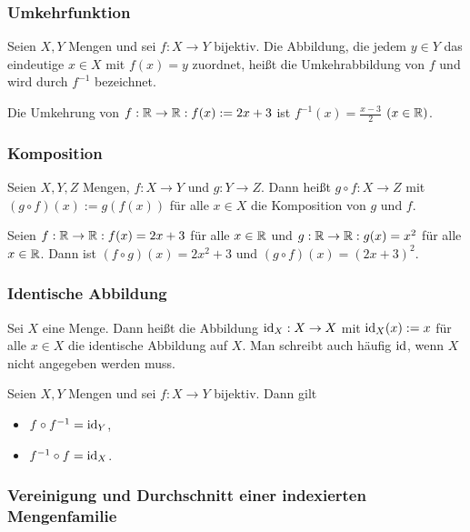 \subsubsection{Umkehrfunktion}

Seien $ X,Y $ Mengen und sei $ f : X \to Y $ bijektiv. Die Abbildung, die jedem $ y \in Y $ das eindeutige $ x \in X $ mit $ f(x) = y $ zuordnet, heißt die Umkehrabbildung von $ f $ und wird durch $ f^{-1} $ bezeichnet.

\begin{bsp}
	Die Umkehrung von $ f : \mathbb R \to \mathbb R : f(x) := 2x + 3 $ ist $ f^{-1}(x) = \frac{x-3}{2} $ $ ( x \in \mathbb R ) $.
\end{bsp}

\subsubsection{Komposition}

Seien $ X,Y,Z $ Mengen, $ f : X \to Y $ und $ g : Y \to Z $. Dann heißt $ g \circ f : X \to Z $ mit $ ( g \circ f )(x) := g( f(x) ) $ für alle $ x \in X $ die Komposition von $ g $ und $ f $.

\begin{bsp}
	Seien $ f : \mathbb R \to \mathbb R : f(x) = 2x + 3 $ für alle $ x \in \mathbb R $ und $ g : \mathbb R \to \mathbb R : g(x) = x^2 $ für alle $ x \in \mathbb R $. Dann ist $ ( f \circ g )(x) = 2x^2 + 3 $ und $ ( g \circ f )(x) = (2x + 3)^2 $.
\end{bsp}

\subsubsection{Identische Abbildung}

Sei $ X $ eine Menge. Dann heißt die Abbildung $ \operatorname{id}_X : X \to X $ mit $ \operatorname{id}_X(x) := x $ für alle $ x \in X $ die identische Abbildung auf $ X $. Man schreibt auch häufig $ \operatorname{id} $, wenn $ X $ nicht angegeben werden muss.

\begin{bem}
	Seien $ X,Y $ Mengen und sei $ f : X \to Y $ bijektiv. Dann gilt
	\begin{itemize}
		\item $ f \circ f^{-1} = \operatorname{id}_Y $,
		\item $ f^{-1} \circ f = \operatorname{id}_X $.
	\end{itemize}
\end{bem} 

\subsubsection{Vereinigung und Durchschnitt einer indexierten Mengenfamilie}

